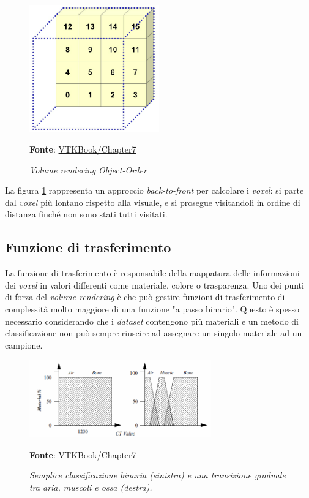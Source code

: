 \begin{figure}[h]
    \centering
    \includegraphics[width=0.5\textwidth]{immagini/volumerendering/objectorder.png}
    \caption{\textit{Volume rendering Object-Order}}
    \textbf{Fonte}: \href{https://lorensen.github.io/VTKExamples/site/VTKBook/07Chapter7/}{VTKBook/Chapter7}
    \label{fig: Volume Rendering Object-Order}
\end{figure}

La figura \ref{fig: Volume Rendering Object-Order} rappresenta un approccio \emph{back-to-front} per calcolare i \emph{voxel}: si parte dal \emph{voxel} più lontano rispetto alla visuale, e si prosegue visitandoli in ordine di distanza finché non sono stati tutti visitati.

\subsection{Funzione di trasferimento}\label{sec:funzione-trasferimento}
La funzione di trasferimento è responsabile della mappatura delle informazioni dei \emph{voxel} in valori differenti come materiale, colore o trasparenza. Uno dei punti di forza del \emph{volume rendering} è che può gestire funzioni di trasferimento di complessità molto maggiore di una funzione "a passo binario". Questo è spesso necessario considerando che i \emph{dataset} contengono più materiali e un metodo di classificazione non può sempre riuscire ad assegnare un singolo materiale ad un campione.

\begin{figure}[h]
    \centering
    \includegraphics[width=0.7\textwidth]{immagini/volumerendering/functions.png}
    \caption{\textit{Semplice classificazione binaria (sinistra) e una transizione graduale tra aria, muscoli e ossa (destra).}}
    \textbf{Fonte}: \href{https://lorensen.github.io/VTKExamples/site/VTKBook/07Chapter7/}{VTKBook/Chapter7}
    \label{fig: Funzione di Trasferimento}
\end{figure}

